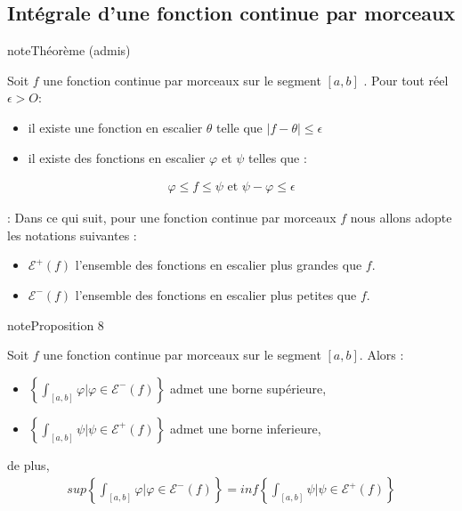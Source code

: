 \documentclass[letterpaper,10pt,french]{jupyterBook}
\begin{document}
\subsection{Intégrale d’une fonction continue par morceaux}
\label{\detokenize{fcm:integrale-d-une-fonction-continue-par-morceaux}}
\begin{sphinxadmonition}{note}{Théorème (admis)}

\sphinxAtStartPar
Soit \(f\) une fonction continue par morceaux sur le segment \([a, b]\) . Pour tout
réel \(\epsilon > O\):
\begin{itemize}
\item {} 
\sphinxAtStartPar
il existe une fonction en escalier \(\theta\) telle que \(|f - \theta| \leq \epsilon\)

\item {} 
\sphinxAtStartPar
il existe des fonctions en escalier \(\varphi\) et \(\psi\) telles que :

\end{itemize}
\begin{equation*}
\begin{split}
\varphi \leq f \leq \psi \mbox{   et  } \psi - \varphi \leq \epsilon
\end{split}
\end{equation*}\end{sphinxadmonition}

\sphinxAtStartPar
{}: Dans ce qui suit, pour une fonction continue par morceaux \(f\) nous allons adopte les notations suivantes :
\begin{itemize}
\item {} 
\sphinxAtStartPar
\(\mathcal{E}^+(f)\) l’ensemble des fonctions en escalier plus grandes que \(f\).

\item {} 
\sphinxAtStartPar
\(\mathcal{E}^-(f)\) l’ensemble des fonctions en escalier plus petites que \(f\).

\end{itemize}

\begin{sphinxadmonition}{note}{Proposition 8}

\sphinxAtStartPar
Soit \(f\) une fonction continue par morceaux sur le segment \([a, b]\). Alors :
\begin{itemize}
\item {} 
\sphinxAtStartPar
\(\left\{\int_{[a, b]} \varphi | \varphi \in \mathcal{E}^-(f)\right\}\) admet une borne supérieure,

\item {} 
\sphinxAtStartPar
\(\left\{\int_{[a, b]} \psi | \psi \in \mathcal{E}^+(f)\right\}\) admet une borne inferieure,

\end{itemize}

\sphinxAtStartPar
de plus,
\begin{equation*}
\begin{split}
sup\left\{\int_{[a, b]} \varphi | \varphi \in \mathcal{E}^-(f)\right\}= inf\left\{\int_{[a, b]} \psi | \psi \in \mathcal{E}^+(f)\right\}
\end{split}
\end{equation*}\end{sphinxadmonition}
\end{document}

